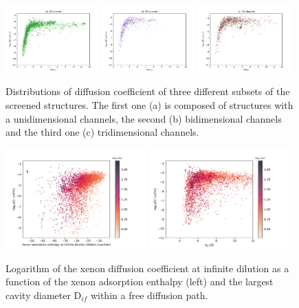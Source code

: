 \documentclass[main]{subfiles}
\begin{document}
\begin{figure}[ht]
  \centering
    \includegraphics[width=0.32\textwidth]{figures/5-diffusion/D_log-PLD_1D_chan.pdf}
    \includegraphics[width=0.32\textwidth]{figures/5-diffusion/D_log-PLD_2D_chan.pdf}
    \includegraphics[width=0.32\textwidth]{figures/5-diffusion/D_log-PLD_3D_chan.pdf}
    \caption{ Distributions of diffusion coefficient of three different subsets of the screened structures. The first one (a) is composed of structures with a unidimensional channels, the second (b) bidimensional channels and the third one (c) tridimensional channels. }\label{fgr:scatter_diffusion_chandim}
\end{figure}


\begin{figure}[ht]
  \centering
    \includegraphics[width=0.48\textwidth]{figures/5-diffusion/D_log-H_Xe_s_+.pdf}
    \includegraphics[width=0.48\textwidth]{figures/5-diffusion/D_log-lcd_s_+.pdf}
    \caption{Logarithm of the xenon diffusion coefficient at infinite dilution as a function of the xenon adsorption enthalpy (left) and the largest cavity diameter D$_{if}$ within a free diffusion path. }\label{fgr:diff_H_lcd}
\end{figure}
\end{document}
